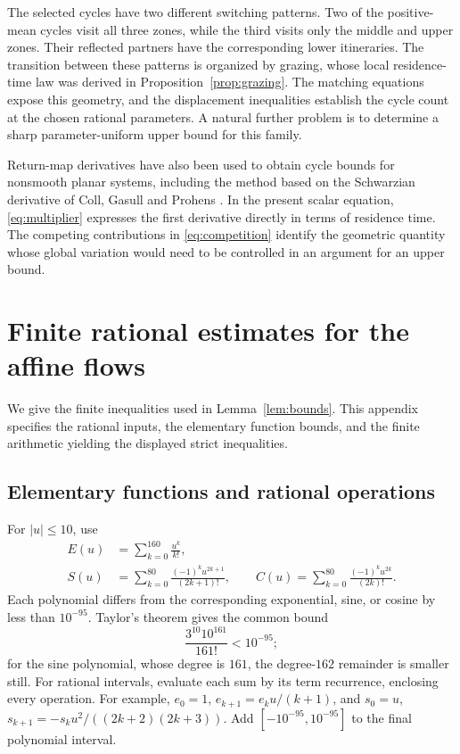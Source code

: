 \documentclass[11pt,a4paper]{article}
\begin{document}
The selected cycles have two different switching patterns. Two of
the positive-mean cycles visit all three zones, while the third visits
only the middle and upper zones. Their reflected partners have the
corresponding lower itineraries. The transition between these patterns
is organized by grazing, whose local residence-time law was derived
in Proposition~\ref{prop:grazing}. The matching equations expose this
geometry, and the displacement inequalities establish the cycle count
at the chosen rational parameters. A natural further problem is to
determine a sharp parameter-uniform upper bound for this family.

Return-map derivatives have also been used to obtain cycle bounds
for nonsmooth planar systems, including the method based on the Schwarzian derivative
of Coll, Gasull and Prohens \cite{Coll1996}. In the present
scalar equation, \eqref{eq:multiplier} expresses the first derivative
directly in terms of residence time. The competing contributions in
\eqref{eq:competition} identify the geometric quantity whose global
variation would need to be controlled in an argument for an upper bound.

\appendix
\section{Finite rational estimates for the affine flows}\label{app:bounds}
We give the finite inequalities used in Lemma~\ref{lem:bounds}.
This appendix specifies the rational inputs, the elementary function bounds,
and the finite arithmetic yielding the displayed strict inequalities.

\subsection{Elementary functions and rational operations}
For $|u|\le10$, use
\begin{align*}
 E(u)&=\sum_{k=0}^{160}\frac{u^k}{k!},\\
 S(u)&=\sum_{k=0}^{80}\frac{(-1)^ku^{2k+1}}{(2k+1)!},\qquad
 C(u)=\sum_{k=0}^{80}\frac{(-1)^ku^{2k}}{(2k)!}.
\end{align*}
Each polynomial differs from the corresponding exponential, sine, or
cosine by less than $10^{-95}$. Taylor's theorem gives the common bound
\[
 \frac{3^{10}10^{161}}{161!}<10^{-95};
\]
for the sine polynomial, whose degree is $161$, the degree-$162$
remainder is smaller still. For rational intervals, evaluate each sum
by its term recurrence, enclosing every operation. For example,
$e_0=1$, $e_{k+1}=e_ku/(k+1)$, and
$s_0=u$, $s_{k+1}=-s_ku^2/((2k+2)(2k+3))$.
Add $[-10^{-95},10^{-95}]$ to the final polynomial interval.
\end{document}

